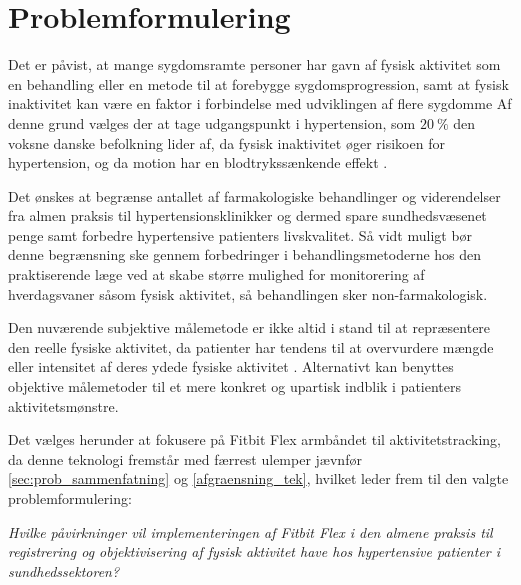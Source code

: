 \section{Problemformulering}


Det er påvist, at mange sygdomsramte personer har gavn af fysisk aktivitet som en behandling eller en metode til at forebygge sygdomsprogression, samt at fysisk inaktivitet kan være en faktor i forbindelse med udviklingen af flere sygdomme \citep{motionsraad2007,pedersen2011}
Af denne grund vælges der at tage udgangspunkt i hypertension, som $20~\%$ den voksne danske befolkning lider af, da fysisk inaktivitet øger risikoen for hypertension, og da motion har en blodtrykssænkende effekt \citep{pedersen2011,olsen2015}. 

Det ønskes at begrænse antallet af farmakologiske behandlinger og viderendelser fra almen praksis til hypertensionsklinikker og dermed spare sundhedsvæsenet penge samt forbedre hypertensive patienters livskvalitet. Så vidt muligt bør denne begrænsning ske gennem forbedringer i behandlingsmetoderne hos den praktiserende læge ved at skabe større mulighed for monitorering af hverdagsvaner såsom fysisk aktivitet, så behandlingen sker non-farmakologisk.

Den nuværende subjektive målemetode er ikke altid i stand til at repræsentere den reelle fysiske aktivitet, da patienter har tendens til at overvurdere mængde eller intensitet af deres ydede fysiske aktivitet \citep{motionsraad2007,pedersen2011,prince2008}. Alternativt kan benyttes objektive målemetoder til et mere konkret og upartisk indblik i patienters aktivitetsmønstre. 

Det vælges herunder at fokusere på Fitbit Flex armbåndet til aktivitetstracking, da denne teknologi fremstår med færrest ulemper jævnfør \autoref{sec:prob_sammenfatning} og \autoref{afgraensning_tek}, hvilket leder frem til den valgte problemformulering: 


\begin{center}
\textit{Hvilke påvirkninger vil implementeringen af Fitbit Flex i den almene praksis til registrering og objektivisering af fysisk aktivitet have hos hypertensive patienter i sundhedssektoren?}
\end{center}
